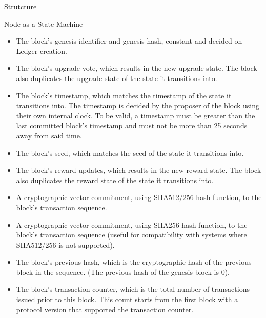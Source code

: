 \documentclass[10pt,a4paper]{article}
\begin{document}
\begin{section}{Strutcture}
\begin{subsection}{Node as a State Machine}
\begin{itemize}
    \item
    The block's genesis identifier and genesis hash, constant and decided on
    Ledger creation.
    
    \item
    The block's upgrade vote, which results in the new upgrade state. The
    block also duplicates the upgrade state of the state it transitions into.
    
    \item
    The block's timestamp, which matches the timestamp of the state it transitions into. 
    The timestamp is decided by the proposer of the block using their own internal clock. 
    To be valid, a timestamp must be greater than the last committed block's timestamp 
    and must not be more than 25 seconds away from said time.
    
    \item
    The block's seed, which matches the seed of the state it transitions into.
    
    \item
    The block's reward updates, which results in the new reward state. The
    block also duplicates the reward state of the state it transitions into.
    
    \item
    A cryptographic vector commitment, using SHA512/256 hash function,
    to the block's transaction sequence.
    
    \item
    A cryptographic vector commitment, using SHA256 hash function, to the block's
    transaction sequence (useful for compatibility with systems where SHA512/256 
    is not supported).
    
    \item
    The block's previous hash, which is the cryptographic hash of the previous
    block in the sequence. (The previous hash of the genesis block is 0).
    
    \item
    The block's transaction counter, which is the total number of transactions
    issued prior to this block. This count starts from the first block with a
    protocol version that supported the transaction counter.
    

\end{itemize}
\end{subsection}
\end{section}
\end{document}
